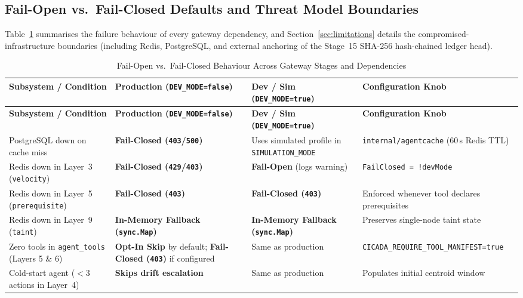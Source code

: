 \documentclass[11pt, a4paper]{article}
\begin{document}
\subsection{Fail-Open vs.\ Fail-Closed Defaults and Threat Model Boundaries}
\label{subsec:fail-modes}

Table~\ref{tab:fail-modes} summarises the failure behaviour of every gateway dependency, and Section~\ref{sec:limitations} details the compromised-infrastructure boundaries (including Redis, PostgreSQL, and external anchoring of the Stage~15 SHA-256 hash-chained ledger head).

\begin{small}
\begin{longtable}{@{} p{4.4cm} p{3.8cm} p{3.4cm} p{3.8cm} @{}}
\caption{Fail-Open vs.\ Fail-Closed Behaviour Across Gateway Stages and Dependencies}
\label{tab:fail-modes} \\
\toprule
\textbf{Subsystem / Condition} & \textbf{Production (\texttt{DEV\_MODE=false})} & \textbf{Dev / Sim (\texttt{DEV\_MODE=true})} & \textbf{Configuration Knob} \\
\midrule
\endfirsthead
\toprule
\textbf{Subsystem / Condition} & \textbf{Production (\texttt{DEV\_MODE=false})} & \textbf{Dev / Sim (\texttt{DEV\_MODE=true})} & \textbf{Configuration Knob} \\
\midrule
\endhead
\bottomrule
\endfoot
PostgreSQL down on cache miss & \textbf{Fail-Closed (\texttt{403}/\texttt{500})} & Uses simulated profile in \texttt{SIMULATION\_MODE} & \texttt{internal/agentcache} (60\,s Redis TTL) \\
\addlinespace
Redis down in Layer~3 (\texttt{velocity}) & \textbf{Fail-Closed (\texttt{429}/\texttt{403})} & \textbf{Fail-Open} (logs warning) & \texttt{FailClosed = !devMode} \\
\addlinespace
Redis down in Layer~5 (\texttt{prerequisite}) & \textbf{Fail-Closed (\texttt{403})} & \textbf{Fail-Closed (\texttt{403})} & Enforced whenever tool declares prerequisites \\
\addlinespace
Redis down in Layer~9 (\texttt{taint}) & \textbf{In-Memory Fallback (\texttt{sync.Map})} & \textbf{In-Memory Fallback (\texttt{sync.Map})} & Preserves single-node taint state \\
\addlinespace
Zero tools in \texttt{agent\_tools} (Layers 5 \& 6) & \textbf{Opt-In Skip} by default; \textbf{Fail-Closed (\texttt{403})} if configured & Same as production & \texttt{CICADA\_REQUIRE\_TOOL\_MANIFEST=true} \\
\addlinespace
Cold-start agent ($<3$ actions in Layer~4) & \textbf{Skips drift escalation} & Same as production & Populates initial centroid window \\

\end{longtable}
\end{small}
\end{document}

